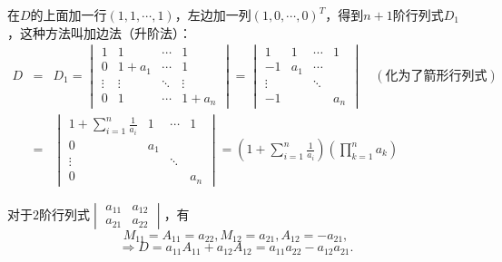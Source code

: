 \begin{solution}[解法三]
在$D$的上面加一行$(1,1,\cdots,1)$，左边加一列$(1,0,\cdots,0)^T$，得到$n+1$阶行列式$D_1$，这种方法叫加边法（升阶法）：
\begin{eqnarray*}
D & = & D_1 = \begin{vmatrix}
1 & 1 & \cdots & 1 \\ 0 & 1+a_1 & \cdots & 1 \\ \vdots & \vdots & \ddots & \vdots \\ 0 & 1 & \cdots & 1+a_n \end{vmatrix} = \begin{vmatrix}
1 & 1 & \cdots & 1 \\ -1 & a_1 & \cdots & \\ \vdots & & \ddots & \\ -1 & & & a_n \end{vmatrix} \quad (\text{化为了箭形行列式}) \\
& = & \begin{vmatrix} 1+\sum\limits_{i=1}^n\frac{1}{a_i} & 1 & \cdots & 1 \\ 0 & a_1 & & \\ \vdots & & \ddots & \\ 0 & & & a_n \end{vmatrix} = (1+\sum\limits_{i=1}^n\frac{1}{a_i})(\prod\limits_{k=1}^n a_k)
\end{eqnarray*}
\end{solution}

\begin{eg}
对于$2$阶行列式$\begin{vmatrix} a_{11} & a_{12} \\ a_{21} & a_{22} \end{vmatrix}$，有
$$M_{11} = A_{11} = a_{22}, M_{12} = a_{21}, A_{12} = -a_{21},$$
$$\Rightarrow D = a_{11}A_{11} + a_{12}A_{12} = a_{11}a_{22} - a_{12}a_{21}.$$
\end{eg}

